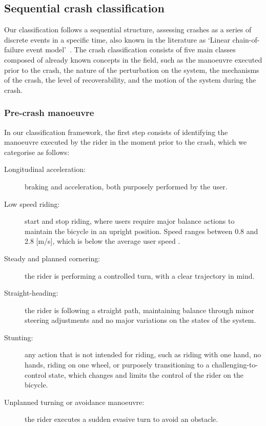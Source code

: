 \documentclass{article}
\begin{document}
\subsection{Sequential crash classification}
%
Our classification follows a sequential structure, assessing crashes as a series of discrete events in a specific time, also known in the literature as `Linear chain-of-failure event model'~\cite{Lev20}.
%
The crash classification consists of five main classes composed of already known concepts in the field, such as the manoeuvre executed prior to the crash, the nature of the perturbation on the system, the mechanisms of the crash, the level of recoverability, and the motion of the system during the crash.

\subsubsection{Pre-crash manoeuvre}
%
In our classification framework, the first step consists of identifying the manoeuvre executed by the rider in the moment prior to the crash, which we categorise as follows:
%
\begin{description}
    \item [Longitudinal acceleration:] braking and acceleration, both purposely performed by the user.
    
    \item [Low speed riding:] start and stop riding, where users require major balance actions to maintain the bicycle in an upright position. 
    Speed ranges between 0.8 and 2.8 [m/s], which is below the average user speed \cite{Cla19}.
    
    \item [Steady and planned cornering:] the rider is performing a controlled turn, with a clear trajectory in mind.
    
    \item [Straight-heading:] the rider is following a straight path, maintaining balance through minor steering adjustments and no major variations on the states of the system.
    
    \item [Stunting:] any action that is not intended for riding, such as riding with one hand, no hands, riding on one wheel, or purposely transitioning to a challenging-to-control state, which changes and limits the control of the rider on the bicycle.
    
    \item [Unplanned turning or avoidance manoeuvre:] the rider executes a sudden evasive turn to avoid an obstacle.
\end{description}
\end{document}
